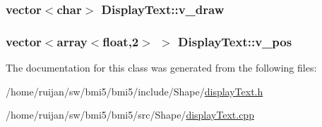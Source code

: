 \hypertarget{classDisplayText_a0f43c42a360464b92fbc9a1b5a2405d4}{
\subsubsection[{v\-\_\-draw}]{\setlength{\rightskip}{0pt plus 5cm}vector$<$char$>$ Display\-Text\-::v\-\_\-draw}}\label{classDisplayText_a0f43c42a360464b92fbc9a1b5a2405d4}
\hypertarget{classDisplayText_a61592bbfe955f9bbe59390ba7f6581bc}{
\subsubsection[{v\-\_\-pos}]{\setlength{\rightskip}{0pt plus 5cm}vector$<$array$<$float,2$>$ $>$ Display\-Text\-::v\-\_\-pos}}\label{classDisplayText_a61592bbfe955f9bbe59390ba7f6581bc}


The documentation for this class was generated from the following files\-:\begin{DoxyCompactItemize}
\item 
/home/ruijan/sw/bmi5/bmi5/include/\-Shape/\hyperlink{displayText_8h}{display\-Text.\-h}\item 
/home/ruijan/sw/bmi5/bmi5/src/\-Shape/\hyperlink{displayText_8cpp}{display\-Text.\-cpp}\end{DoxyCompactItemize}
